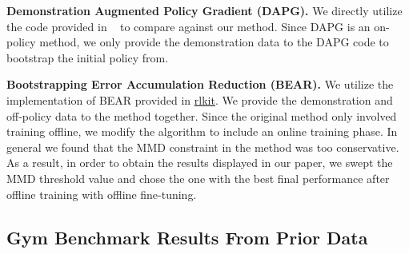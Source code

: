 \textbf{Demonstration Augmented Policy Gradient (DAPG).} We directly utilize the code provided in ~\citep{rajeswaran2018dextrous} to compare against our method. Since DAPG is an on-policy method, we only provide the demonstration data to the DAPG code to bootstrap the initial policy from.



\textbf{Bootstrapping Error Accumulation Reduction (BEAR).} We utilize the implementation of BEAR provided in \href{https://github.com/vitchyr/rlkit}{rlkit}. We provide the demonstration and off-policy data to the method together. Since the original method only involved training offline, we modify the algorithm to include an online training phase. In general we found that the MMD constraint in the method was too conservative. As a result, in order to obtain the results displayed in our paper, we swept the MMD threshold value and chose the one with the best final performance after offline training with offline fine-tuning.



\subsection{Gym Benchmark Results From Prior Data}
\label{sec:gym}

